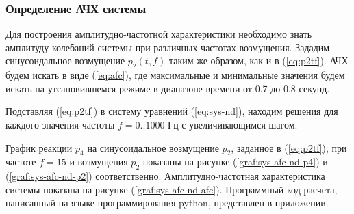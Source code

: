 

\subsubsection{Определение АЧХ системы}

Для построения амплитудно-частотной характеристики необходимо знать амплитуду колебаний системы при различных частотах возмущения. Зададим синусоидальное возмущение $p_2(t, f)$ таким же образом, как и в (\ref{eq:p2tf}). АЧХ будем искать в виде (\ref{eq:afc}), где максимальные и минимальные значения будем искать на утсановившемся режиме в диапазоне времени от 0.7 до 0.8 секунд. 

Подставляя (\ref{eq:p2tf}) в систему уравнений (\ref{eq:sys-nd}), находим решения для каждого значения частоты $f = 0..1000$ Гц с увеличивающимся шагом.

График реакции $p_4$ на синусоидальное возмущение $p_2$, заданное в (\ref{eq:p2tf}), при частоте $f = 15$ и возмущения $p_2$ показаны на рисунке (\ref{graf:sys-afc-nd-p4}) и (\ref{graf:sys-afc-nd-p2}) соответственно. Амплитудно-частотная характеристика системы показана на рисунке (\ref{graf:sys-afc-nd-afc}). Программный код расчета, написанный на языке программирования python, представлен в приложении.

